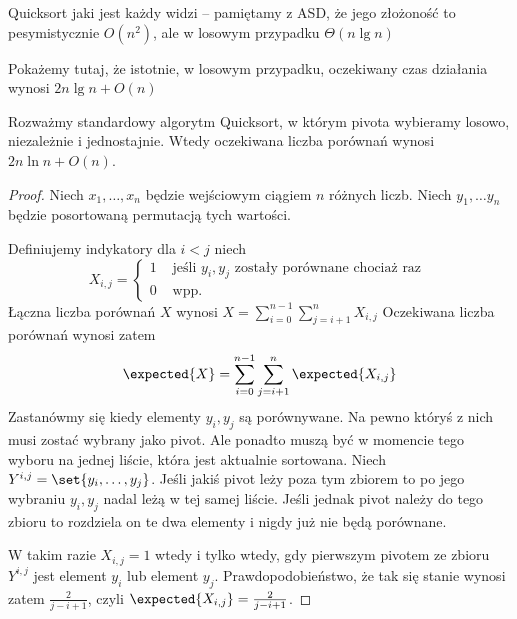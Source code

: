 Quicksort jaki jest każdy widzi -- pamiętamy z ASD, że jego złożoność to pesymistycznie \( O(n^2) \),
ale w losowym przypadku \( \Theta(n \lg n) \)

Pokażemy tutaj, że istotnie, w losowym przypadku, oczekiwany czas działania wynosi \( 2n \lg n + O(n) \)

\begin{theorem}[2.11 P\&C]
    Rozważmy standardowy algorytm Quicksort, w którym pivota wybieramy losowo, niezależnie i jednostajnie.
    Wtedy oczekiwana liczba porównań wynosi \( 2n \ln n + O(n) \).
\end{theorem}
\begin{proof} Niech \( x_1, \dots, x_n \) będzie wejściowym ciągiem \( n \) różnych liczb.
Niech \( y_1, \dots y_n \) będzie posortowaną permutacją tych wartości.

Definiujemy indykatory dla \( i < j \) niech
\[
    X_{i, j} = \begin{cases}
        1 & \text{ jeśli }  y_i, y_j \text{ zostały porównane chociaż raz } \\
        0 & \text{ wpp. }
    \end{cases}
\]
Łączna liczba porównań \( X \) wynosi
\(
    X = \sum_{i = 0}^{n-1} \sum_{j=i+1}^n X_{i, j}
\)
Oczekiwana liczba porównań wynosi zatem
\[
    \expected{X} = \sum_{i = 0}^{n-1} \sum_{j=i+1}^n \expected{X_{i, j}}
\]
Zastanówmy się kiedy elementy \( y_i, y_j \) są porównywane. Na pewno któryś z nich musi zostać wybrany jako pivot.
Ale ponadto muszą być w momencie tego wyboru na jednej liście, która jest aktualnie sortowana.
Niech \( Y^{i, j} = \set{y_i, \dots, y_j} \).
Jeśli jakiś pivot leży poza tym zbiorem to po jego wybraniu \( y_i, y_j \) nadal leżą w tej samej liście.
Jeśli jednak pivot należy do tego zbioru to rozdziela on te dwa elementy i nigdy już nie będą porównane.

W takim razie \( X_{i, j} = 1 \) wtedy i tylko wtedy, gdy pierwszym pivotem ze zbioru \( Y^{i, j} \) jest element \( y_i \) lub element \( y_j \).
Prawdopodobieństwo, że tak się stanie wynosi zatem \( \frac{2}{j - i + 1} \), czyli \( \expected{X_{i, j}} = \frac{2}{j - i + 1} \).


\end{proof}
